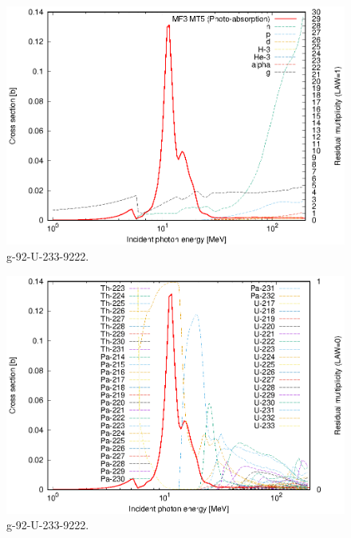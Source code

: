 \begin{figure}
 \includegraphics[width=\linewidth]{eps/g_92-U-233_9222.eps}
  \caption{g-92-U-233-9222.}
\end{figure}
\begin{figure}
 \includegraphics[width=\linewidth]{eps-law0/g_92-U-233_9222.eps}
 \caption{g-92-U-233-9222.}
\end{figure}
\newpage \clearpage


